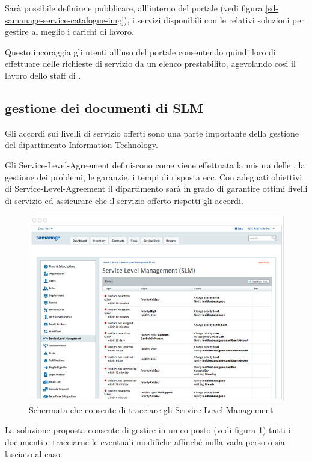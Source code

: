 Sarà possibile definire e pubblicare, all'interno del portale (vedi figura \ref{sd-samanage-service-catalogue-img}), i servizi disponibili con le relativi soluzioni per gestire al meglio i carichi di lavoro.

Questo incoraggia gli utenti all'uso del portale  consentendo quindi loro di effettuare delle richieste di servizio da un elenco prestabilito, agevolando cosi il lavoro dello staff di .

\subsection[Gestione dei documenti di SLM]{gestione dei documenti di SLM}
\label{sd-sla-management}
Gli accordi sui livelli di servizio offerti sono una parte importante della gestione del dipartimento \acs{Information-Technology}.

Gli \ac{Service-Level-Agreement} definiscono come viene effettuata la misura delle , la gestione dei problemi, le garanzie, i tempi di risposta ecc. Con adeguati obiettivi di \ac{Service-Level-Agreement} il dipartimento sarà in grado di garantire ottimi livelli di servizio ed assicurare che il servizio offerto rispetti gli accordi.

\begin{figure}[htbp]
\centering
\includegraphics[scale=0.6]{Images/samanage/Service_level_management.png}
\caption{Schermata che consente di tracciare gli \ac{Service-Level-Management}}
\label{sd-samanage-service-level-management-img}
\end{figure}

La soluzione proposta consente di gestire in unico posto (vedi figura \ref{sd-samanage-service-level-management-img}) tutti i documenti e tracciarne le eventuali modifiche affinché nulla vada perso o sia lasciato al caso.




























